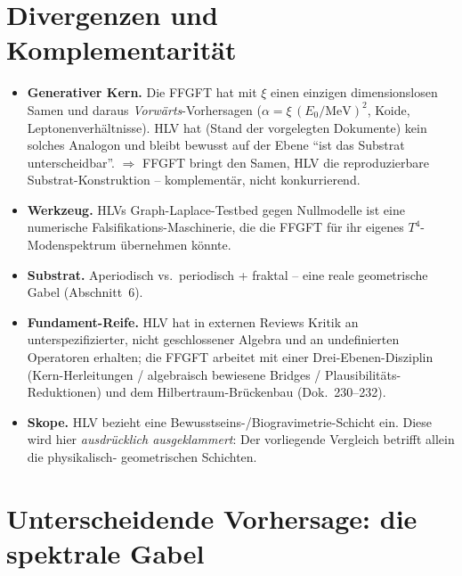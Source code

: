 \section{Divergenzen und Komplementarität}

\begin{itemize}
\item \textbf{Generativer Kern.} Die FFGFT hat mit $\xi$ einen einzigen dimensionslosen Samen und
daraus \emph{Vorwärts}-Vorhersagen ($\alpha=\xi\,(E_0/\text{MeV})^2$, Koide, Leptonenverhältnisse).
HLV hat (Stand der vorgelegten Dokumente) kein solches Analogon und bleibt bewusst auf der Ebene
\enquote{ist das Substrat unterscheidbar}. $\Rightarrow$ FFGFT bringt den Samen, HLV die
reproduzierbare Substrat-Konstruktion -- komplementär, nicht konkurrierend.

\item \textbf{Werkzeug.} HLVs Graph-Laplace-Testbed gegen Nullmodelle ist eine numerische
Falsifikations-Maschinerie, die die FFGFT für ihr eigenes $T^4$-Modenspektrum übernehmen könnte.

\item \textbf{Substrat.} Aperiodisch vs.\ periodisch + fraktal -- eine reale geometrische Gabel
(Abschnitt~6).

\item \textbf{Fundament-Reife.} HLV hat in externen Reviews Kritik an unterspezifizierter,
nicht geschlossener Algebra und an undefinierten Operatoren erhalten; die FFGFT arbeitet mit
einer Drei-Ebenen-Disziplin (Kern-Herleitungen / algebraisch bewiesene Bridges /
Plausibilitäts-Reduktionen) und dem Hilbertraum-Brückenbau (Dok.~230--232).

\item \textbf{Skope.} HLV bezieht eine Bewusstseins-/Biogravimetrie-Schicht ein. Diese wird hier
\emph{ausdrücklich ausgeklammert}: Der vorliegende Vergleich betrifft allein die physikalisch-
geometrischen Schichten.
\end{itemize}

\section{Unterscheidende Vorhersage: die spektrale Gabel}

